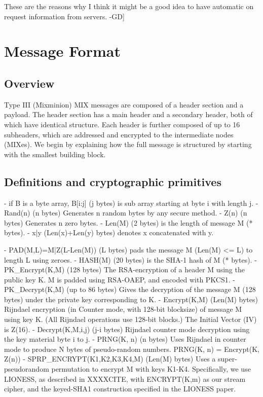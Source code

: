  These are the reasons why I think it might be a good idea to have automatic 
 on request information from servers. -GD]

\section{Message Format}

\subsection{Overview}

Type III (Mixminion) MIX messages are composed of a header section and a
payload.  The header section has a main header and a
secondary header, both of which have identical structure.  Each
header is further composed of up to 16 subheaders, which are
addressed and encrypted to the intermediate nodes (MIXes).  We
begin by explaining how the full message is structured by starting
with the smallest building block.

\subsection{Definitions and cryptographic primitives}

- if B is a byte array, B[i:j] (j bytes) is sub array starting at 
  byte i with length j.
- Rand(n) (n bytes) Generates n random bytes by any secure method.
- Z(n) (n bytes) Generates n zero bytes.
- Len(M) (2 bytes) is the length of message M (* bytes).
- x|y (Len(x)+Len(y) bytes) denotes x concatenated with y.

- PAD(M,L)=M|Z(L-Len(M)) (L bytes) pads the message M (Len(M) <= L)
  to length L using zeroes.
- HASH(M) (20 bytes) is the SHA-1 hash of M (* bytes).
- PK_Encrypt(K,M) (128 bytes) The RSA-encryption of a header M 
  using the public key K.  M is padded using RSA-OAEP, and encoded
  with PKCS1.
- PK_Decrypt(K,M) (up to 86 bytes) Gives the decryption of the
  message M (128 bytes) under the private key corresponding to K.
- Encrypt(K,M) (Len(M) bytes) Rijndael encryption (in Counter mode,
  with 128-bit blocksize) of message M using key K.  (All Rijndael
  operations use 128-bit blocks.)  The Initial Vector (IV) is Z(16).
- Decrypt(K,M,i,j) (j-i bytes) Rijndael counter mode decryption 
  using the key material byte i to j.
- PRNG(K, n) (n bytes) Uses Rijndael in counter mode to produce N
  bytes of pseudo-random numbers.
  PRNG(K, n) = Encrypt(K, Z(n))
- SPRP_ENCRYPT(K1,K2,K3,K4,M) (Len(M) bytes) Uses a super-pseudorandom
  permutation to encrypt M with keys K1-K4.  Specifically, we use LIONESS,
  as described in XXXXCITE, with ENCRYPT(K,m) as our stream cipher,
  and the keyed-SHA1 construction specified in the LIONESS paper.

